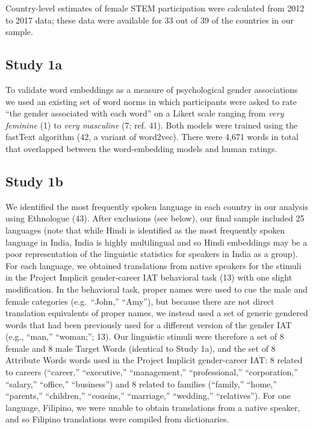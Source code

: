 \documentclass[9pt,twocolumn]{pnas-new}
\begin{document}
Country-level estimates of female STEM participation were calculated from 2012 to 2017 data; these data were available for 33 out of 39 of the countries in our sample.


\subsection*{Study 1a}


To validate word embeddings as a measure of psychological
gender associations we used an existing set of word norms in which participants
were asked to rate \enquote{the gender associated with each word} on a
Likert scale ranging from \emph{very feminine} (1) to \emph{very
masculine} (7; ref. 41).  Both models were trained using the fastText algorithm (42, a variant of word2vec). There were 4,671
words in total that overlapped between the word-embedding models and
human ratings.


\subsection*{Study 1b}

We identified the most frequently spoken language in each country in our
analysis using Ethnologue (43). After exclusions
(see below), our final sample included 25
languages (note that while Hindi is identified as the most frequently spoken language in India, India is highly multilingual and so Hindi embeddings may be a poor representation of  the linguistic statistics for speakers in India as a group).
For each language, we obtained translations from native speakers for the
stimuli in the Project Implicit gender-career IAT behavioral task (13) with one slight modification. In the behavioral task,
proper names were used to cue the male and female categories
(e.g.~\enquote{John,} \enquote{Amy}), but because there are not direct
translation equivalents of proper names, we instead used a set of
generic gendered words that had been previously used for a different
version of the gender IAT (e.g., ``man,'' ``woman;''; 13). Our linguistic stimuli were therefore a set of 8 female and 8
male Target Words (identical to Study 1a), and the set of 8 Attribute
Words words used in the Project Implicit gender-career IAT: 8 related to
careers (\enquote{career,} \enquote{executive,} \enquote{management,}
\enquote{professional,} \enquote{corporation,} \enquote{salary,}
\enquote{office,} \enquote{business}) and 8 related to families
(\enquote{family,} \enquote{home,} \enquote{parents,}
\enquote{children,} \enquote{cousins,} \enquote{marriage,}
\enquote{wedding,} \enquote{relatives}). For one language, Filipino, we
were unable to obtain translations from a native speaker, and so
Filipino translations were compiled from dictionaries.
\end{document}
